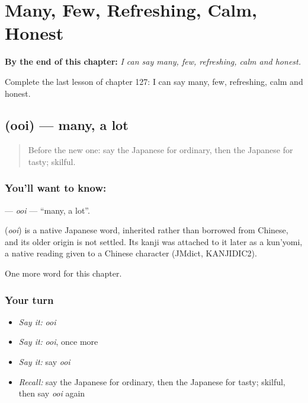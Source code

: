 
\chapter{Many, Few, Refreshing, Calm, Honest}
\label{ch:ja-many-few-refreshing-calm-honest}

\begin{chapteropening}
\textbf{By the end of this chapter:} \emph{I can say many, few, refreshing, calm and honest.}

Complete the last lesson of chapter 127: I can say many, few, refreshing, calm and honest.
\end{chapteropening}

\section[\texorpdfstring{\ja{おおい} (ooi)}{おおい (ooi)}]{ (ooi) — many, a lot}

\label{lesson:JA-C127-ooi}



\begin{quote}
Before the new one: say the Japanese for ordinary, then the Japanese for tasty; skilful.
\end{quote}

\subsection*{You'll want to know: }
\textbf{} — \emph{ooi} — \textquotedblleft{}many, a lot\textquotedblright{}.

\begin{cousinweb}
\textbf{} (\emph{ooi}) is a native Japanese word, inherited rather than borrowed from Chinese, and its older origin is not settled. Its kanji was attached to it later as a kun'yomi, a native reading given to a Chinese character (JMdict, KANJIDIC2).
\end{cousinweb}

\begin{grammarlens}[title={What you've built}]
One more word for this chapter.
\end{grammarlens}

\subsection*{Your turn}
\begin{itemize}
\raggedright
  \item \emph{Say it:} \emph{ooi}
  \item \emph{Say it:} \emph{ooi}, once more
  \item \emph{Say it:} say \emph{ooi}
  \item \emph{Recall:} say the Japanese for ordinary, then the Japanese for tasty; skilful, then say \emph{ooi} again
\end{itemize}

